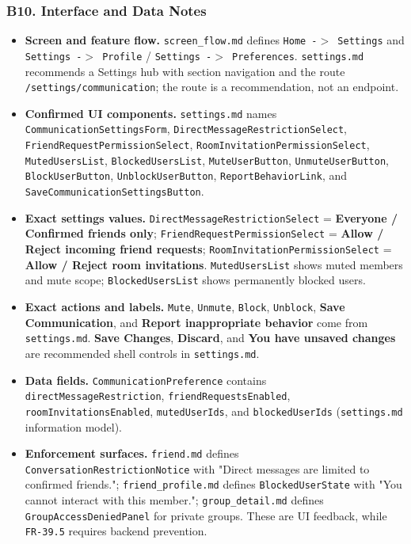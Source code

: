 \documentclass[12pt]{article}
\begin{document}
\hypertarget{sec:b10-interface-and-data-notes}{}
\subsubsection*{B10. Interface and Data Notes}
\par\medskip

\begin{itemize}
\item \textbf{Screen and feature flow.} \texttt{screen\_flow.md} defines \texttt{Home -$>$ Settings} and \texttt{Settings -$>$ Profile} / \texttt{Settings -$>$ Preferences}. \texttt{settings.md} recommends a Settings hub with section navigation and the route \texttt{/settings/communication}; the route is a recommendation, not an endpoint.
\item \textbf{Confirmed UI components.} \texttt{settings.md} names \texttt{CommunicationSettingsForm}, \texttt{DirectMessageRestrictionSelect}, \texttt{FriendRequestPermissionSelect}, \texttt{RoomInvitationPermissionSelect}, \texttt{MutedUsersList}, \texttt{BlockedUsersList}, \texttt{MuteUserButton}, \texttt{UnmuteUserButton}, \texttt{BlockUserButton}, \texttt{UnblockUserButton}, \texttt{ReportBehaviorLink}, and \texttt{SaveCommunicationSettingsButton}.
\item \textbf{Exact settings values.} \texttt{DirectMessageRestrictionSelect} = \textbf{Everyone / Confirmed friends only}; \texttt{FriendRequestPermissionSelect} = \textbf{Allow / Reject incoming friend requests}; \texttt{RoomInvitationPermissionSelect} = \textbf{Allow / Reject room invitations}. \texttt{MutedUsersList} shows muted members and mute scope; \texttt{BlockedUsersList} shows permanently blocked users.
\item \textbf{Exact actions and labels.} \texttt{Mute}, \texttt{Unmute}, \texttt{Block}, \texttt{Unblock}, \textbf{Save Communication}, and \textbf{Report inappropriate behavior} come from \texttt{settings.md}. \textbf{Save Changes}, \textbf{Discard}, and \textbf{You have unsaved changes} are recommended shell controls in \texttt{settings.md}.
\item \textbf{Data fields.} \texttt{CommunicationPreference} contains \texttt{directMessageRestriction}, \texttt{friendRequestsEnabled}, \texttt{roomInvitationsEnabled}, \texttt{mutedUserIds}, and \texttt{blockedUserIds} (\texttt{settings.md} information model).
\item \textbf{Enforcement surfaces.} \texttt{friend.md} defines \texttt{ConversationRestrictionNotice} with "Direct messages are limited to confirmed friends."; \texttt{friend\_profile.md} defines \texttt{BlockedUserState} with "You cannot interact with this member."; \texttt{group\_detail.md} defines \texttt{GroupAccessDeniedPanel} for private groups. These are UI feedback, while \texttt{FR-39.5} requires backend prevention.

\end{itemize}
\end{document}
